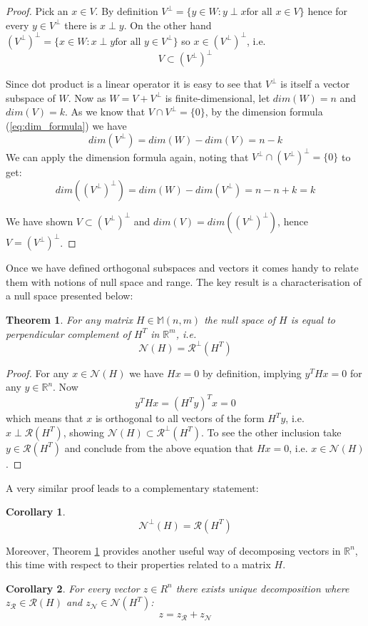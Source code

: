 \documentclass[a4paper]{article}
\theoremstyle{break}
\newtheorem{theorem}{Theorem}[section]
\newtheorem{corollary}{Corollary}[theorem]
\newcommand{\R}{\mathbb{R}}
\newcommand{\Nu}{\mathcal{N}}
\newcommand{\Ra}{\mathcal{R}}
\newcommand{\Mat}[2]{\mathbb{M}(#1, #2)}
\begin{document}
\begin{proof}
    Pick an $x \in V$. By definition $ V^\perp = \{ y \in W : y \perp x \text{for all } x \in V \}$ hence for every $y \in V^\perp $ there is $x \perp y$. On the other hand $ (V^\perp)^\perp = \{ x \in W : x \perp y \text{for all } y \in V^\perp \}$ so $x \in (V^\perp)^\perp$, i.e.
    $$ V \subset (V^\perp)^\perp$$

    Since dot product is a linear operator it is easy to see that $V^\perp$ is itself a vector subspace of $W$.
    Now as $W = V + V^\perp$ is finite-dimensional, let $dim(W) = n$ and $dim(V) = k$. 
    As we know that $V \cap V^\perp = \{0\}$, by the dimension formula (\ref{eq:dim_formula}) we have
    $$ dim(V^\perp) = dim(W) - dim(V) = n - k $$
    We can apply the dimension formula again, noting that $ V^\perp \cap (V^\perp)^\perp = \{0\} $ to get:
    $$ dim((V^\perp)^\perp) = dim(W) - dim(V^\perp) = n - n + k = k $$
    
    We have shown $ V \subset (V^\perp)^\perp$ and $ dim(V) = dim((V^\perp)^\perp)$,
    hence $ V = (V^\perp)^\perp$.
\end{proof}
Once we have defined orthogonal subspaces and vectors it comes handy to relate them with notions of null space and range. The key result is a characterisation of a null space presented below:


\begin{theorem} \label{thm:charact_nullspace}
    For any matrix $H \in \Mat{n}{m}$ the null space of $H$ is equal to perpendicular complement of $H^T$ in $\R^m$, i.e.
    $$\Nu(H) = \Ra^\perp(H^T)$$
\end{theorem}

\begin{proof}
    For any $x \in \Nu(H)$ we have $H x = 0$ by definition, implying $ y^T H x = 0$ for any $y \in \R^n$. Now
    $$  y^T H x = (H^T y )^T x = 0$$
    which means that $x$ is orthogonal to all vectors of the form $ H^T y $, i.e. $ x \perp \Ra(H^T)$, showing $ \Nu(H) \subset \Ra^\perp(H^T)$. To see the other inclusion take $ y \in \Ra(H^T) $ and conclude from the above equation that $ H x = 0$, i.e. $ x \in \Nu(H)$.
\end{proof}
A very similar proof leads to a complementary statement:
\begin{corollary} \label{cor:charact_range}
    $$\Nu^\perp(H) = \Ra(H^T)$$
\end{corollary}

Moreover, Theorem \ref{thm:charact_nullspace} provides another useful way of decomposing vectors in $\R^n$, this time with respect to their properties related to a matrix $H$.
\begin{corollary}
    For every vector $z \in R^n$ there exists unique decomposition where $z_\Ra \in \Ra(H)$ and $z_\Nu \in \Nu(H^T)$:
    $$z = z_\Ra + z_\Nu$$
\end{corollary}
\end{document}

